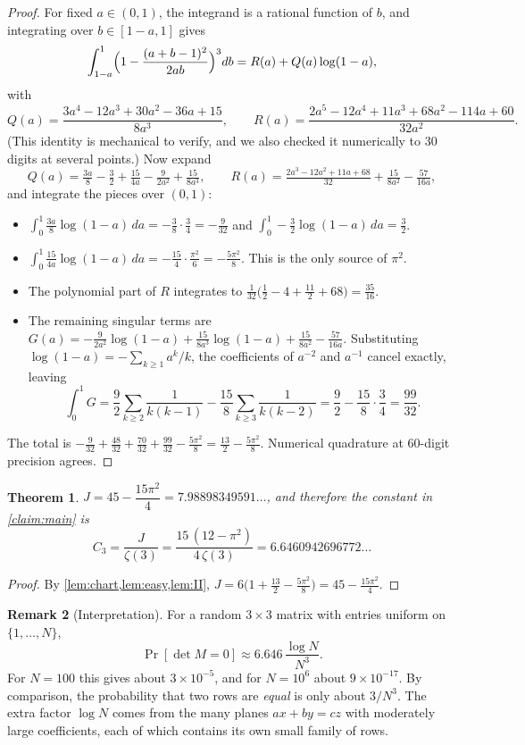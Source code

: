 \documentclass[11pt]{article}
\newtheorem{theorem}{Theorem}[section]
\theoremstyle{definition}
\newtheorem{remark}[theorem]{Remark}
\begin{document}
\begin{proof}
For fixed $a\in(0,1)$, the integrand is a rational function of $b$, and integrating over $b\in[1-a,1]$ gives
\[
\int_{1-a}^{1}\Bigl(1-\frac{(a+b-1)^2}{2ab}\Bigr)^3db=R(a)+Q(a)\log(1-a),
\]
with
\[
Q(a)=\frac{3a^4-12a^3+30a^2-36a+15}{8a^3},\qquad
R(a)=\frac{2a^5-12a^4+11a^3+68a^2-114a+60}{32a^2}.
\]
(This identity is mechanical to verify, and we also checked it numerically to $30$ digits at several points.) Now expand
\[
Q(a)=\tfrac{3a}{8}-\tfrac32+\tfrac{15}{4a}-\tfrac{9}{2a^2}+\tfrac{15}{8a^3},\qquad
R(a)=\tfrac{2a^3-12a^2+11a+68}{32}+\tfrac{15}{8a^2}-\tfrac{57}{16a},
\]
and integrate the pieces over $(0,1)$:
\begin{itemize}
\item $\int_0^1\frac{3a}{8}\log(1-a)\,da=-\frac{3}{8}\cdot\frac34=-\frac{9}{32}$ and $\int_0^1-\frac32\log(1-a)\,da=\frac32$.
\item $\int_0^1\frac{15}{4a}\log(1-a)\,da=-\frac{15}{4}\cdot\frac{\pi^2}{6}=-\frac{5\pi^2}{8}$. This is the only source of $\pi^2$.
\item The polynomial part of $R$ integrates to $\frac{1}{32}\bigl(\frac12-4+\frac{11}{2}+68\bigr)=\frac{35}{16}$.
\item The remaining singular terms are $G(a)=-\frac{9}{2a^2}\log(1-a)+\frac{15}{8a^3}\log(1-a)+\frac{15}{8a^2}-\frac{57}{16a}$. Substituting $\log(1-a)=-\sum_{k\ge1}a^k/k$, the coefficients of $a^{-2}$ and $a^{-1}$ cancel exactly, leaving
\[
\int_0^1G=\frac92\sum_{k\ge2}\frac{1}{k(k-1)}-\frac{15}{8}\sum_{k\ge3}\frac{1}{k(k-2)}=\frac92-\frac{15}{8}\cdot\frac34=\frac{99}{32}.
\]
\end{itemize}
The total is $-\frac{9}{32}+\frac{48}{32}+\frac{70}{32}+\frac{99}{32}-\frac{5\pi^2}{8}=\frac{13}{2}-\frac{5\pi^2}{8}$. Numerical quadrature at $60$-digit precision agrees.
\end{proof}

\begin{theorem}\label{thm:J}
$J=45-\dfrac{15\pi^2}{4}=7.98898349591\ldots$, and therefore the constant in \cref{claim:main} is
\[
C_3=\frac{J}{\zeta(3)}=\frac{15\,(12-\pi^2)}{4\,\zeta(3)}=6.6460942696772\ldots
\]
\end{theorem}

\begin{proof}
By \cref{lem:chart,lem:easy,lem:II}, $J=6\bigl(1+\frac{13}{2}-\frac{5\pi^2}{8}\bigr)=45-\frac{15\pi^2}{4}$.
\end{proof}

\begin{remark}[Interpretation]
For a random $3\times3$ matrix with entries uniform on $\{1,\dots,N\}$,
\[
\Pr[\det M=0]\approx 6.646\,\frac{\log N}{N^3}.
\]
For $N=100$ this gives about $3\times10^{-5}$, and for $N=10^6$ about $9\times10^{-17}$. By comparison, the probability that two rows are \emph{equal} is only about $3/N^3$. The extra factor $\log N$ comes from the many planes $ax+by=cz$ with moderately large coefficients, each of which contains its own small family of rows.
\end{remark}
\end{document}
